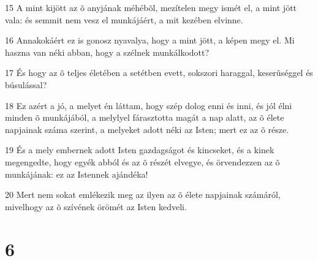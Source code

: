 \par 15 A mint kijött az õ anyjának méhébõl, mezítelen megy ismét el, a mint jött vala: és semmit nem vesz el munkájáért, a mit kezében elvinne.
\par 16 Annakokáért ez is gonosz nyavalya, hogy a mint jött, a képen megy el. Mi haszna van néki abban, hogy a szélnek munkálkodott?
\par 17 És hogy az õ teljes életében a setétben evett, sokszori haraggal, keserûséggel és búsulással?
\par 18 Ez azért a jó, a melyet én láttam, hogy szép dolog enni és inni, és jól élni minden õ munkájából, a melylyel fárasztotta magát a nap alatt, az õ élete napjainak száma szerint, a melyeket adott néki az Isten; mert ez az õ része.
\par 19 És a mely embernek adott Isten gazdagságot és kincseket, és a kinek megengedte, hogy egyék abból és az õ részét elvegye, és örvendezzen az õ munkájának: ez az Istennek ajándéka!
\par 20 Mert nem sokat emlékezik meg az ilyen az õ élete napjainak számáról, mivelhogy az õ szívének örömét az Isten kedveli.

\chapter{6}

